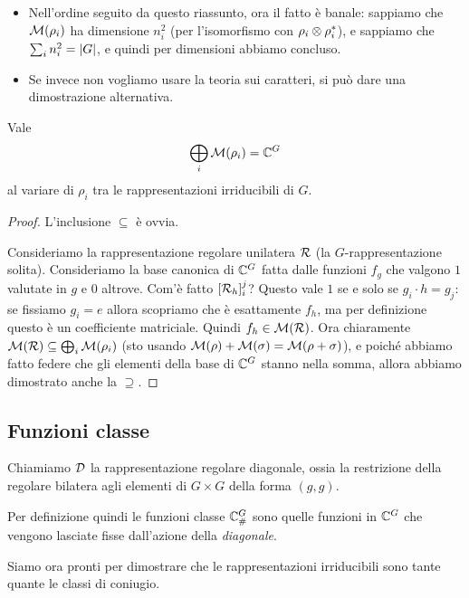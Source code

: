 	\begin{itemize}
	 \item Nell'ordine seguito da questo riassunto, ora il fatto è banale: sappiamo che $\mathcal M(\rho_i)$ ha dimensione $n_i^2$ (per l'isomorfismo con $\rho_i \otimes \rho_i^*$), e sappiamo che $\sum_i n_i^2 = \left|G\right|$, e quindi per dimensioni abbiamo concluso.
	 \item Se invece non vogliamo usare la teoria sui caratteri, si può dare una dimostrazione alternativa.
	\end{itemize}
	
	\begin{myprop}\label{prop:MatElDirSum}
		Vale
		\[
			\bigoplus_i \mathcal M(\rho_i) = \mathbb C^{G}
		\]
		al variare di $\rho_i$ tra le rappresentazioni irriducibili di $G$.
	\end{myprop}
	\begin{proof}
		L'inclusione $\subseteq$ è ovvia.
		
		Consideriamo la rappresentazione regolare unilatera $\mathcal R$ (la $G$-rappresentazione solita). Consideriamo la base canonica di $\mathbb C^{G}$ fatta dalle funzioni $f_g$ che valgono $1$ valutate in $g$ e $0$ altrove. Com'è fatto $[\mathcal R_h]_i^j$? Questo vale $1$ se e solo se $g_i\cdot h = g_j$: se fissiamo $g_i=e$ allora scopriamo che è esattamente $f_h$, ma per definizione questo è un coefficiente matriciale. Quindi $f_h\in \mathcal M(\mathcal R)$. Ora chiaramente $\mathcal M(\mathcal R) \subseteq \bigoplus_i \mathcal M(\rho_i)$ (sto usando $\mathcal M(\rho)+\mathcal M(\sigma)=\mathcal M(\rho+\sigma)$), e poiché abbiamo fatto federe che gli elementi della base di $\mathbb C^{G}$ stanno nella somma, allora abbiamo dimostrato anche la $\supseteq$.
	\end{proof}
	
	\subsection{Funzioni classe}
		\begin{mydef}
			Chiamiamo $\mathcal D$ la rappresentazione regolare diagonale, ossia la restrizione della regolare bilatera agli elementi di $G\times G$ della forma $(g,g)$.
		\end{mydef}
		Per definizione quindi le funzioni classe $\mathbb C^{G}_\#$ sono quelle funzioni in $\mathbb C^{G}$ che vengono lasciate fisse dall'azione della \emph{diagonale}. 
		
		Siamo ora pronti per dimostrare che le rappresentazioni irriducibili sono tante quante le classi di coniugio.
		
